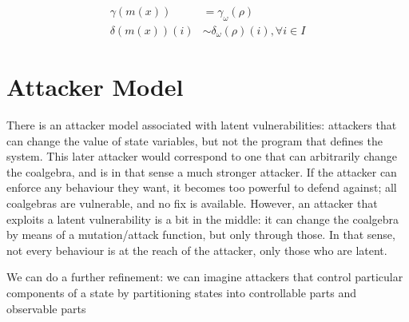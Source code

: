 

\begin{align}
\gamma(m(x))&=\gamma_\omega(\rho)\\
\delta(m(x))(i)&\sim \delta_\omega(\rho)(i), \forall i\in I
\end{align}


 
\section{Attacker Model}
There is an attacker model associated with latent vulnerabilities: attackers that can change the value of state variables, but not the program that defines the system. This later attacker would correspond to one that can arbitrarily change the coalgebra, and is in that sense a much stronger attacker. If the attacker can enforce any behaviour they want, it becomes too powerful to defend against; all coalgebras are vulnerable, and no fix is available. However, an attacker that exploits a latent vulnerability is a bit in the middle: it can change the coalgebra by means of a mutation/attack function, but only through those. In that sense, not every behaviour is at the reach of the attacker, only those who are latent.

We can do a further refinement: we can imagine attackers that control particular components of a state by partitioning states into controllable parts and observable parts





